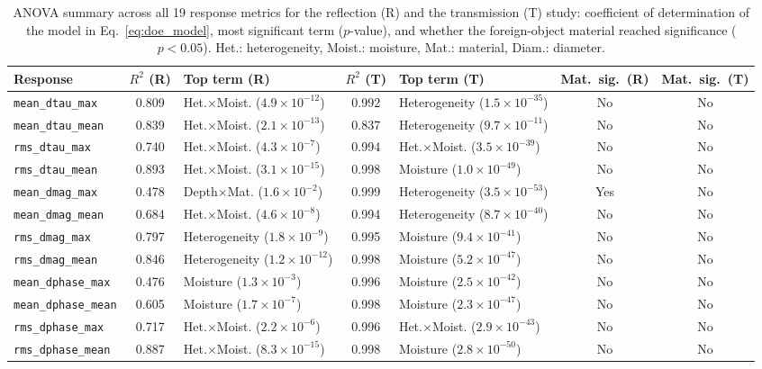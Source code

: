 \begin{table}[t]
\centering
\caption{ANOVA summary across all 19 response metrics for the reflection (R) and the transmission (T) study: coefficient of determination of the model in Eq.~\ref{eq:doe_model}, most significant term ($p$-value), and whether the foreign-object material reached significance ($p<0.05$). Het.: heterogeneity, Moist.: moisture, Mat.: material, Diam.: diameter.}
\label{tab:anova_summary_all}
\begin{tabular}{lcl cl cc}
\hline
Response & $R^2$ (R) & Top term (R) & $R^2$ (T) & Top term (T) & Mat.\ sig.\ (R) & Mat.\ sig.\ (T)\\
\hline
\texttt{mean\_dtau\_max} & 0.809 & Het.$\times$Moist. ($4.9\times10^{-12}$) & 0.992 & Heterogeneity ($1.5\times10^{-35}$) & No & No\\
\texttt{mean\_dtau\_mean} & 0.839 & Het.$\times$Moist. ($2.1\times10^{-13}$) & 0.837 & Heterogeneity ($9.7\times10^{-11}$) & No & No\\
\texttt{rms\_dtau\_max} & 0.740 & Het.$\times$Moist. ($4.3\times10^{-7}$) & 0.994 & Het.$\times$Moist. ($3.5\times10^{-39}$) & No & No\\
\texttt{rms\_dtau\_mean} & 0.893 & Het.$\times$Moist. ($3.1\times10^{-15}$) & 0.998 & Moisture ($1.0\times10^{-49}$) & No & No\\
\texttt{mean\_dmag\_max} & 0.478 & Depth$\times$Mat. ($1.6\times10^{-2}$) & 0.999 & Heterogeneity ($3.5\times10^{-53}$) & Yes & No\\
\texttt{mean\_dmag\_mean} & 0.684 & Het.$\times$Moist. ($4.6\times10^{-8}$) & 0.994 & Heterogeneity ($8.7\times10^{-40}$) & No & No\\
\texttt{rms\_dmag\_max} & 0.797 & Heterogeneity ($1.8\times10^{-9}$) & 0.995 & Moisture ($9.4\times10^{-41}$) & No & No\\
\texttt{rms\_dmag\_mean} & 0.846 & Heterogeneity ($1.2\times10^{-12}$) & 0.998 & Moisture ($5.2\times10^{-47}$) & No & No\\
\texttt{mean\_dphase\_max} & 0.476 & Moisture ($1.3\times10^{-3}$) & 0.996 & Moisture ($2.5\times10^{-42}$) & No & No\\
\texttt{mean\_dphase\_mean} & 0.605 & Moisture ($1.7\times10^{-7}$) & 0.998 & Moisture ($2.3\times10^{-47}$) & No & No\\
\texttt{rms\_dphase\_max} & 0.717 & Het.$\times$Moist. ($2.2\times10^{-6}$) & 0.996 & Het.$\times$Moist. ($2.9\times10^{-43}$) & No & No\\
\texttt{rms\_dphase\_mean} & 0.887 & Het.$\times$Moist. ($8.3\times10^{-15}$) & 0.998 & Moisture ($2.8\times10^{-50}$) & No & No\\

\end{tabular}
\end{table}
